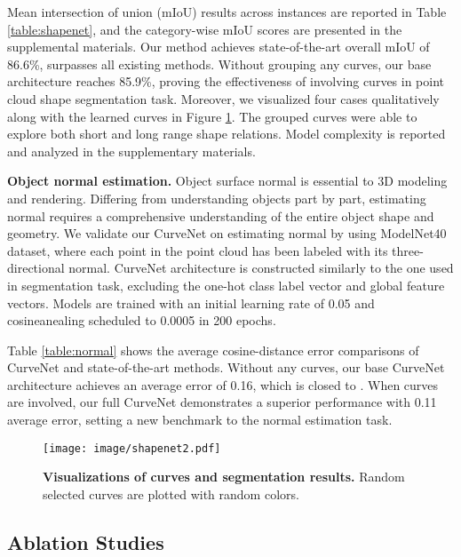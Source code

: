 \documentclass[10pt,twocolumn,letterpaper]{article}
\theoremstyle{definition}
\begin{document}
Mean intersection of union (mIoU) results across instances are reported in Table \ref{table:shapenet}, and the category-wise mIoU scores are presented in the supplemental materials. Our method achieves state-of-the-art overall mIoU of 86.6\%, surpasses all existing methods. Without grouping any curves, our base architecture reaches 85.9\%, proving the effectiveness of involving curves in point cloud shape segmentation task. Moreover, we visualized four cases qualitatively along with the learned curves in Figure \ref{fig:shapenet}. The grouped curves were able to explore both short and long range shape relations. Model complexity is reported and analyzed in the supplementary materials.

\noindent
\textbf{Object normal estimation.} Object surface normal is essential to 3D modeling and rendering. Differing from understanding objects part by part, estimating normal requires a comprehensive understanding of the entire object shape and geometry. We validate our CurveNet on estimating normal by using ModelNet40 dataset, where each point in the point cloud has been labeled with its three-directional normal. CurveNet architecture is constructed similarly to the one used in segmentation task, excluding the one-hot class label vector and global feature vectors. Models are trained with an initial learning rate of 0.05 and cosineanealing scheduled to 0.0005 in 200 epochs.

Table \ref{table:normal} shows the average cosine-distance error comparisons of CurveNet and state-of-the-art methods. Without any curves, our base CurveNet architecture achieves an average error of 0.16, which is closed to \cite{liu2019relation, guo2020pct}. When curves are involved, our full CurveNet demonstrates a superior performance with 0.11 average error, setting a new benchmark to the normal estimation task.



\begin{figure}[t]
	\begin{center}
\texttt{[image: image/shapenet2.pdf]}
	\end{center}
	\caption{\textbf{Visualizations of curves and segmentation results.} Random selected curves are plotted with random colors.}
	\label{fig:shapenet}
\end{figure}

\subsection{Ablation Studies}
\end{document}
